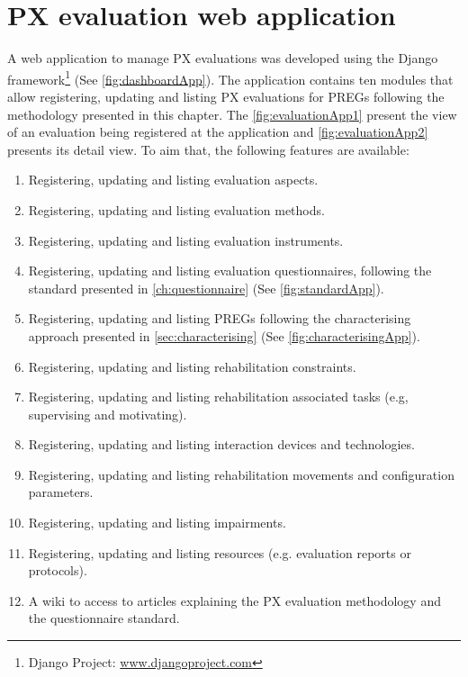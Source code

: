 \chapter{PX evaluation web application}
\label{ch:web_app}

A web application to manage \ac{PX} evaluations was developed using the Django framework\footnote{Django Project: \url{www.djangoproject.com}} (See \autoref{fig:dashboardApp}). The application contains ten modules that allow registering, updating and listing \ac{PX} evaluations for \acp{PREG} following the methodology presented in this chapter. The \autoref{fig:evaluationApp1} present the view of an evaluation being registered at the application and \autoref{fig:evaluationApp2} presents its detail view. To aim that, the following features are available:

\begin{enumerate}
    \item Registering, updating and listing evaluation aspects.
    \item Registering, updating and listing evaluation methods.
    \item Registering, updating and listing evaluation instruments.
    \item Registering, updating and listing evaluation questionnaires, following the standard presented in \autoref{ch:questionnaire} (See \autoref{fig:standardApp}).
    \item Registering, updating and listing \acp{PREG} following the characterising approach presented in \autoref{sec:characterising} (See \autoref{fig:characterisingApp}).
    \item Registering, updating and listing rehabilitation constraints.
    \item Registering, updating and listing rehabilitation associated tasks (e.g, supervising and motivating).
    \item Registering, updating and listing interaction devices and technologies.
    \item Registering, updating and listing rehabilitation movements and configuration parameters.
    \item Registering, updating and listing impairments.
    \item Registering, updating and listing resources (e.g. evaluation reports or protocols).
    \item A wiki to access to articles explaining the \ac{PX} evaluation methodology and the questionnaire standard.
\end{enumerate}

